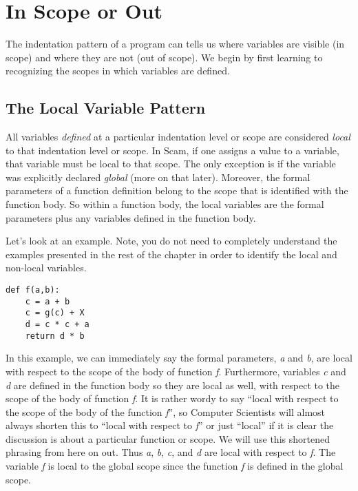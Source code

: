 \section{In Scope or Out}

The indentation pattern of a program can tells us where
variables are visible (in scope) and where they are
not (out of scope).
We begin by first learning to recognizing the scopes in which variables
are defined.

\subsection{The Local Variable Pattern}

All variables {\it defined} at a particular
indentation level or scope are considered
{\it local} to that indentation level or scope.
In Scam, if one assigns a value to a variable, that variable
must be local to that scope.
The only exception is if the variable was
explicitly declared {\it global} (more on that later).
Moreover, the formal parameters of a function definition
belong to the scope that is identified with
the function body. 
So within a function body, the local variables are the formal
parameters plus any variables defined in the function body.

Let's look at an example.
Note,
you do not need to completely understand the examples presented in
the rest of the chapter in order 
to identify the local and non-local variables.

\begin{verbatim}
def f(a,b):
    c = a + b
    c = g(c) + X
    d = c * c + a
    return d * b
\end{verbatim}

In this example, we can immediately say the 
formal parameters,
{\it a} and {\it b},
are local with respect to the scope of the body of function {\it f}.
Furthermore, variables
{\it c} and {\it d}
are defined in the function body
so they are local as well,
with respect to the scope of the body of function {\it f}.
It is rather wordy to say ``local with respect to the
scope of the body of the function {\it f}'', so Computer Scientists
will almost always shorten this to ``local with respect to {\it f}''
or just ``local''
if it is clear the discussion is about a particular function or scope.
We will use this shortened phrasing from here on out.
Thus {\it a}, {\it b}, {\it c}, and {\it d} are local with respect to {\it f}.
The variable {\it f} is local to the global scope since the function
{\it f} is defined in the global scope.

